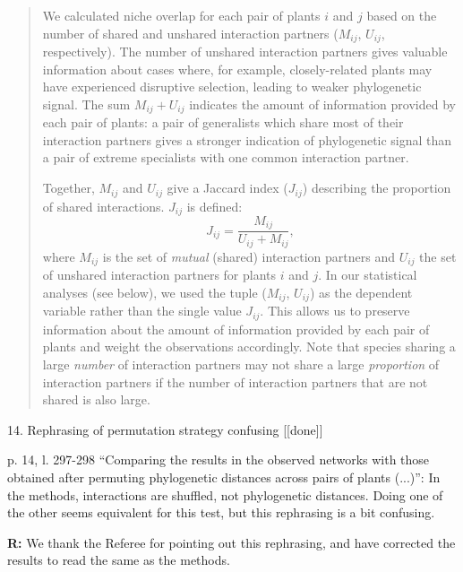 \documentclass[12pt]{letter}
\newenvironment{refquote}{\bigskip \begin{it}}{\end{it}\smallskip}
\begin{document}
		\begin{quotation}

			We calculated niche overlap for each pair of plants $i$ and $j$ based on the number of shared and unshared interaction partners ($M_{ij}$, $U_{ij}$, respectively). 
			The number of unshared interaction 
			partners gives valuable information about cases where, for example, 
			closely-related plants may have experienced disruptive selection, leading to weaker phylogenetic signal. 
			The sum $M_{ij} + U_{ij}$ indicates the amount of information  provided by each pair of plants: a pair of generalists which share most of their interaction partners gives a stronger indication of phylogenetic signal than a pair of extreme specialists with one common interaction partner.


			Together, $M_{ij}$ and $U_{ij}$ give a Jaccard index ($J_{ij}$) describing 
			the proportion of shared interactions. $J_{ij}$ is defined: 
			\begin{equation}
			J_{ij} = \frac{M_{ij}}{U_{ij}+M_{ij}} ,
			\end{equation}
			where $M_{ij}$ is the set of \emph{mutual} (shared) interaction partners and $U_{ij}$ the set of unshared interaction partners for plants $i$ and $j$.
			In our statistical analyses (see below), we used the tuple ($M_{ij}$, $U_{ij}$) as the
			dependent variable rather than the single value $J_{ij}$. 
			This allows us to preserve information about the amount of information provided by each pair of plants and weight the observations accordingly.
			Note that species sharing a large \emph{number} of interaction partners may not share a large \emph{proportion} of interaction partners if the number of interaction partners that are not shared is also large.

		    \end{quotation}


	14. Rephrasing of permutation strategy confusing [[done]]
		
		\begin{refquote}
			p. 14, l. 297-298 “Comparing the results in the observed networks with those obtained after permuting phylogenetic distances across pairs of plants (...)”: In the methods, interactions are shuffled, not phylogenetic distances. Doing one of the other seems equivalent for this test, but this rephrasing is a bit confusing.
		\end{refquote}


		\textbf{R:} We thank the Referee for pointing out this rephrasing, and have corrected the results to read the same as the methods.
\end{document}
